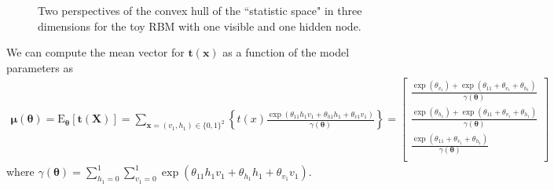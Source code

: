 \documentclass[]{article}
\theoremstyle{definition}
\begin{document}
\par
\begin{figure}[ht]
  \begin{minipage}{0.45\textwidth}
  \end{minipage}
  \begin{minipage}{0.45\textwidth}
  \end{minipage}
  \caption{Two perspectives of the convex hull of the ``statistic space" in three dimensions for the toy RBM with one visible and one hidden node.}
\label{fig:toyhull}
\end{figure}
We can compute the mean vector for \(\boldsymbol t(\boldsymbol x)\) as a
function of the model parameters as \begin{align*}
\boldsymbol \mu(\boldsymbol \theta) = \text{E}_{\boldsymbol \theta}\left[ \boldsymbol t(\boldsymbol X) \right] =  \sum\limits_{\boldsymbol x = (v_1, h_1) \in \{0,1\}^2} \left\{ t(x) \frac{\exp\left( \theta_{11} h_1 v_1 + \theta_{h1} h_1 + \theta_{v1} v_1\right)}{\gamma(\boldsymbol \theta)} \right\} = \left[
\begin{matrix}
\frac{\exp\left(\theta_{v_1}\right) + \exp\left(\theta_{11} + \theta_{v_1} + \theta_{h_1}\right)}{\gamma(\boldsymbol \theta)} \\
\frac{\exp\left(\theta_{h_1}\right) + \exp\left(\theta_{11} + \theta_{v_1} + \theta_{h_1}\right)}{\gamma(\boldsymbol \theta)} \\
\frac{\exp\left(\theta_{11} + \theta_{v_1} + \theta_{h_1}\right)}{\gamma(\boldsymbol \theta)} \\
\end{matrix} \right]
\end{align*} where
\(\gamma(\boldsymbol \theta) = \sum\limits_{h_1 = 0}^1\sum\limits_{v_1 = 0}^1 \exp(\theta_{11} h_1 v_1 + \theta_{h_1}h_1 + \theta_{v_1}v_1)\).
\end{document}
